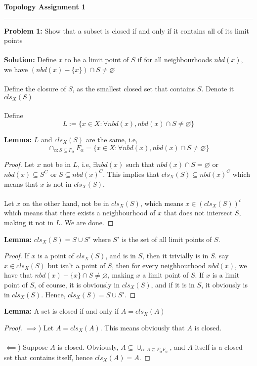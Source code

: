 \documentclass[main.tex]{subfiles}
\begin{document}
\begin{center}
\textbf{Topology Assignment 1}
\end{center}
\par\noindent\rule{\textwidth}{0.4pt}
\textbf{Problem 1:} Show that a subset is closed if and only if it contains all of its limit points
\\\\ \textbf{Solution:} Define $x$ to be a limit point of $S$ if for all neighbourhoods $nbd(x)$, we have $(nbd(x)-\{x\}) \cap S\neq \varnothing$
\\\\ Define the closure of $S$, as the smallest closed set that contains $S$. Denote it $cls_X(S)$
\\\\ Define $$L:=\{x \in X: \forall nbd(x), nbd(x)\cap S\neq \varnothing\}$$

\textbf{Lemma: } $L$ and $cls_X(S)$ are the same, i.e, $$\cap_{\alpha: S \subseteq F_{\alpha}} F_{\alpha} = \{x \in X: \forall nbd(x), nbd(x)\cap S \neq \varnothing\} $$
\begin{proof}
Let $x$ not be in $L$, i.e, $\exists nbd(x)$ such that $nbd(x) \cap S=\varnothing$ or $nbd(x) \subseteq S^C$ or $S \subseteq nbd(x)^C$. This implies that $cls_X(S) \subseteq nbd(x)^C$ which means that $x$ is not in $cls_X(S)$.
\\\\ Let $x$ on the other hand, not be in $cls_X(S)$, which means $x \in (cls_X(S))^c$ which means that there exists a neighbourhood of $x$ that does not intersect $S$, making it not in $L$. We are done.
\end{proof}

\textbf{Lemma: } $cls_X(S)=S \cup S'$ where $S'$ is the set of all limit points of $S$.
\begin{proof}
If $x$ is a point of $cls_X(S)$, and is in $S$, then it trivially is in $S$. say $x \in cls_X(S)$ but isn't a point of $S$, then for every neighbourhood $nbd(x)$, we have that $nbd(x)-\{x\} \cap S \neq \varnothing$, making $x$ a limit point of $S$. If $x$ is a limit point of $S$, of course, it is obviously in $cls_X(S)$, and if it is in $S$, it obviously is in $cls_X(S)$. Hence, $cls_X(S)=S \cup S'$.
\end{proof}

\textbf{Lemma:} A set is closed if and only if $A=cls_X(A)$
\begin{proof}
$\implies$) Let $A= cls_X(A)$. This means obviously that $A$ is closed.
\\\\ $\impliedby$) Suppose $A$ is closed. Obviously, $A \subseteq \cup_{\alpha: A \subseteq F_{\alpha}F_{\alpha}}$, and $A$ itself is a closed set that contains itself, hence $cls_X(A)=A$. 
\end{proof}
\end{document}
